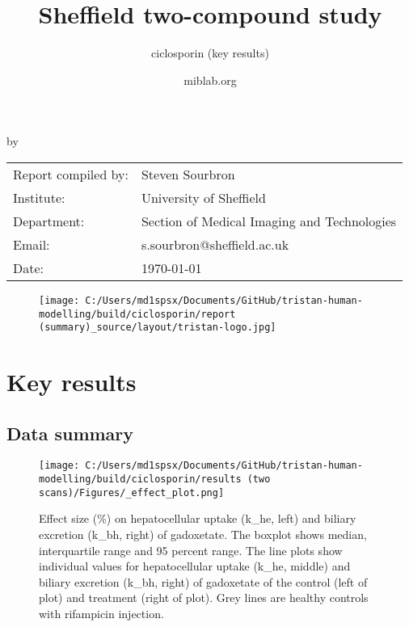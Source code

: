\documentclass{epflreport}%
\begin{document}
%
\normalsize%
\frontmatter%
\title{Sheffield two{-}compound study}%
\subtitle{ciclosporin (key results)}%
\author{miblab.org}%
\subject{D2.13 {-} Internal report}%
%
%
%
\makecover%
\begin{titlepage}%
\begin{center}%
\makeatletter%
\largetitlestyle\fontsize{45}{45}\selectfont\@title%
\makeatother%
\linebreak%
\makeatletter%
\ifdefvoid{\@subtitle}{}{\bigskip\titlestyle\fontsize{20}{20}\selectfont\@subtitle}%
\makeatother%
\linebreak%
\bigskip%
\bigskip%
by%
\linebreak%
\bigskip%
\bigskip%
\makeatletter%
\largetitlestyle\fontsize{25}{25}\selectfont\@author%
\makeatother%
\vfill%
\large%
\begin{tabular}{ll}%
\hline%
Report compiled by: &Steven Sourbron\\%
Institute: &University of Sheffield\\%
Department: &Section of Medical Imaging and Technologies\\%
Email: &s.sourbron@sheffield.ac.uk\\%
Date: &\today\\%
\hline%
\end{tabular}%


\begin{figure}[b!]%
\centering%
\centering%
\texttt{[image: C:/Users/md1spsx/Documents/GitHub/tristan-human-modelling/build/ciclosporin/report (summary)\_source/layout/tristan-logo.jpg]}%
\end{figure}

%
\end{center}%
\end{titlepage}%
\newpage%
\tableofcontents%
\mainmatter%
\clearpage%
\chapter{Key results}%
\section{Data summary}%
\label{sec:Datasummary}%

%


\begin{figure}[h!]%
\centering%
\texttt{[image: C:/Users/md1spsx/Documents/GitHub/tristan-human-modelling/build/ciclosporin/results (two scans)/Figures/\_effect\_plot.png]}%
\caption{Effect size (\%) on hepatocellular uptake (k\_he, left) and biliary excretion (k\_bh, right) of gadoxetate. The boxplot shows median, interquartile range and 95 percent range. The line plots show individual values for hepatocellular uptake (k\_he, middle) and biliary excretion (k\_bh, right) of gadoxetate of the control (left of plot) and treatment (right of plot). Grey lines are healthy controls with rifampicin injection.}%
\end{figure}
\end{document}
